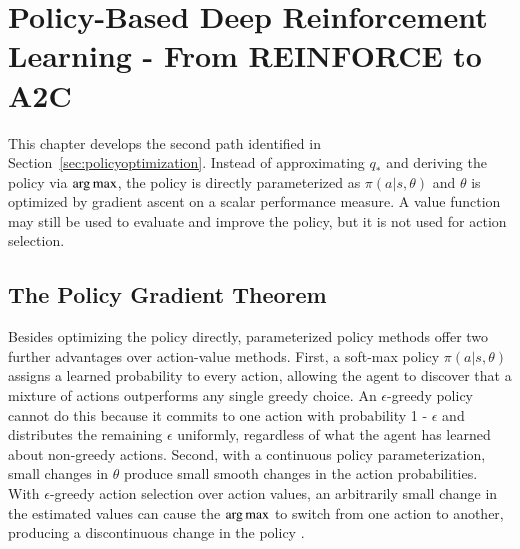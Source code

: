 \chapter {Policy-Based Deep Reinforcement Learning - From REINFORCE to A2C}
\label{chap:a2c}

This chapter develops the second path identified in Section~\ref{sec:policyoptimization}. Instead of approximating $q_*$ and deriving the policy via $\operatorname*{arg\,max}$, the policy is directly parameterized as $\pi(a|s, \theta)$ and $\theta$ is optimized by gradient ascent on a scalar performance measure. A value function may still be used to evaluate and improve the policy, but it is not used for action selection.

\section{The Policy Gradient Theorem}
Besides optimizing the policy directly, parameterized policy methods offer two further advantages over action-value methods. First, a soft-max policy $\pi(a|s, \theta)$ \citep[p.~322]{suttonReinforcementLearningIntroduction2020} assigns a learned probability to every action, allowing the agent to discover that a mixture of actions outperforms any single greedy choice. An $\epsilon$-greedy policy cannot do this because it commits to one action with probability 1 - $\epsilon$ and distributes the remaining $\epsilon$ uniformly, regardless of what the agent has learned about non-greedy actions. Second, with a continuous policy parameterization, small changes in $\theta$ produce small smooth changes in the action probabilities. With $\epsilon$-greedy action selection over action values, an arbitrarily small change in the estimated values can cause the $\operatorname*{arg\,max}$ to switch from one action to another, producing a discontinuous change in the policy \citep[p.~324]{suttonReinforcementLearningIntroduction2020}.

